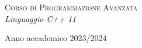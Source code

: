 \begin{center}
  \vspace{2 cm} 
  \Huge\textsc{Corso di Programmazione Avanzata\\}
   \vspace{1 cm} 
  \Large{\it{Linguaggio C++ 11}}


  \vspace{2 cm} 

  \vspace{2 cm} 

  \Large{Anno accademico 2023/2024}

\end{center}